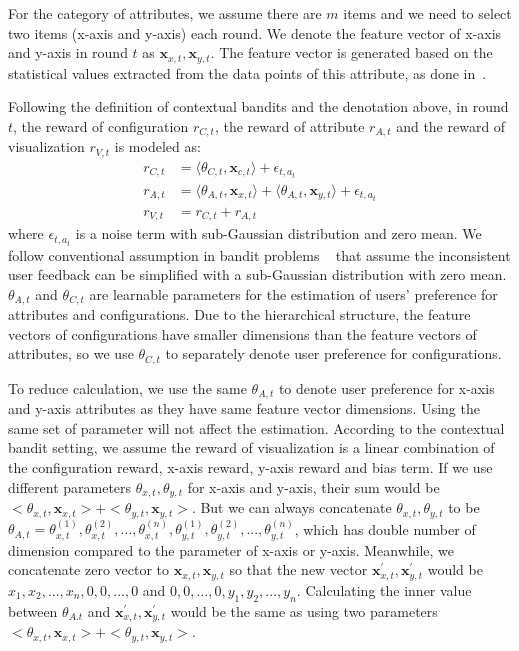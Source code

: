 For the category of attributes, we assume there are $m$ items and we need to select two items (x-axis and y-axis) each round. We denote the feature vector of x-axis and y-axis in round $t$ as $\mathbf x_{x,t}, \mathbf x_{y,t}$.
The feature vector is generated based on the statistical values extracted from the data points of this attribute, as done in~\cite{ML-based-Vis-Rec}. 

Following the definition of contextual bandits and the denotation above, in round $t$, the reward of configuration $r_{C,t}$, the reward of attribute $r_{A,t}$ and the reward of visualization $r_{V,t}$ is modeled as:
\begin{align}
  r_{C,t} &= \langle \theta_{C,t}, \mathbf x_{c,t} \rangle + \epsilon_{t,a_t}\\
  r_{A,t} &= \langle \theta_{A,t}, \mathbf x_{x,t} \rangle + \langle \theta_{A,t}, \mathbf x_{y,t} \rangle + \epsilon_{t,a_t}\\
  r_{V,t} &= r_{C,t}+r_{A,t}
  \label{equ:comb}
\end{align}
where $\epsilon_{t,a_t}$ is a noise term with sub-Gaussian distribution and zero mean. We follow conventional assumption in bandit problems ~\cite{vakili2021optimal} that assume the inconsistent user feedback can be simplified with a sub-Gaussian distribution with zero mean. $\theta_{A,t}$ and $\theta_{C,t}$ are learnable parameters for the estimation of users' preference for attributes and configurations. Due to the hierarchical structure, the feature vectors of configurations have smaller dimensions than the feature vectors of attributes, so we use $\theta_{C,t}$ to separately denote user preference for configurations. 

To reduce calculation, we use the same $\theta_{A,t}$ to denote user preference for x-axis and y-axis attributes as they have same feature vector dimensions. Using the same set of parameter will not affect the estimation. According to the contextual bandit setting, we assume the reward of visualization is a linear combination of the configuration reward, x-axis reward, y-axis reward and bias term. If we use different parameters $\theta_{x,t},\theta_{y,t}$ for x-axis and y-axis, their sum would be $<\theta_{x,t}, \mathbf x_{x,t}>+<\theta_{y,t}, \mathbf x_{y,t}>$. But we can always concatenate $\theta_{x,t},\theta_{y,t}$ to be $\theta_{A,t}={\theta_{x,t}^{(1)},\theta_{x,t}^{(2)},...,\theta_{x,t}^{(n)},\theta_{y,t}^{(1)},\theta_{y,t}^{(2)},...,\theta_{y,t}^{(n)}}$, which has double number of dimension compared to the parameter of x-axis or y-axis. Meanwhile, we concatenate zero vector to $\mathbf x_{x,t}, \mathbf x_{y,t}$ so that the new vector $\mathbf x_{x,t}^\prime, \mathbf x_{y,t}^\prime$ would be ${x_1,x_2,...,x_n,0,0,...,0}$ and ${0,0,...,0,y_1,y_2,...,y_n}$. Calculating the inner value between $\theta_{A.t}$ and $\mathbf x_{x,t}^\prime, \mathbf x_{y,t}^\prime$ would be the same as using two parameters $<\theta_{x,t}, \mathbf x_{x,t}>+<\theta_{y,t}, \mathbf x_{y,t}>$.

